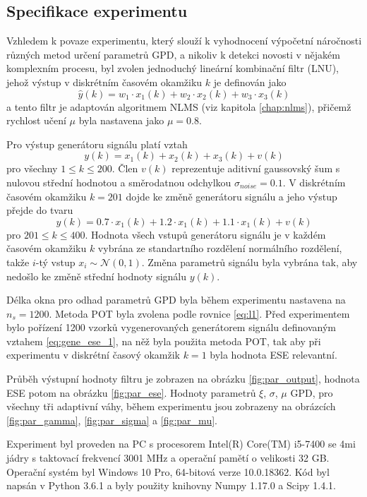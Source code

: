 \subsection{Specifikace experimentu}
Vzhledem k povaze experimentu, který slouží k vyhodnocení výpočetní náročnosti různých metod určení parametrů GPD, a nikoliv k detekci novosti v nějakém komplexním procesu, byl zvolen jednoduchý lineární kombinační filtr (LNU), jehož výstup v diskrétním časovém okamžiku $k$ je definován jako
\begin{equation}\label{eq:gene_ese_1}
\hat{y}(k)=w_1\cdot x_1(k)+w_2\cdot x_2(k)+w_3\cdot x_3(k)
\end{equation}
a tento filtr je adaptován algoritmem NLMS (viz kapitola \ref{chap:nlms}), přičemž rychlost učení $\mu$ byla nastavena jako $\mu=0.8$.
\par 
Pro výstup generátoru signálu platí vztah
\begin{equation}
y(k)=x_1(k)+x_2(k)+x_3(k)+v(k)
\end{equation}
pro všechny $1 \leq k \leq 200$. Člen $v(k)$ reprezentuje aditivní gaussovský šum s nulovou střední hodnotou a směrodatnou odchylkou $\sigma_{noise}=0.1$. V diskrétním časovém okamžiku $k=201$ dojde ke změně generátoru signálu a jeho výstup přejde do tvaru
\begin{equation}
y(k)=0.7\cdot x_1(k)+1.2\cdot x_1(k)+1.1 \cdot x_1(k) + v(k)
\end{equation}
pro $201 \leq k \leq 400$. Hodnota všech vstupů generátoru signálu je v každém časovém okamžiku $k$ vybrána ze standartního rozdělení normálního rozdělení, takže $i$-tý vstup $x_i\sim \mathcal{N}(0,1)$. Změna parametrů signálu byla vybrána tak, aby nedošlo ke změně střední hodnoty signálu $y(k)$.
\par
Délka okna pro odhad parametrů GPD byla během experimentu nastavena na $n_s=1200$. Metoda POT byla zvolena podle rovnice \ref{eq:l1}. Před experimentem bylo pořízení 1200 vzorků vygenerovaných generátorem signálu definovaným vztahem \ref{eq:gene_ese_1}, na něž byla použita metoda POT, tak aby při experimentu v diskrétní časový okamžik $k=1$ byla hodnota ESE relevantní.
\par
Průběh výstupní hodnoty filtru je zobrazen na obrázku \ref{fig:par_output}, hodnota ESE potom na obrázku \ref{fig:par_ese}. Hodnoty parametrů $\xi$, $\sigma$, $\mu$ GPD, pro všechny tři adaptivní váhy, během experimentu jsou zobrazeny na obrázcích \ref{fig:par_gamma}, \ref{fig:par_sigma} a \ref{fig:par_mu}.
\par
Experiment byl proveden na PC s procesorem Intel(R) Core(TM) i5-7400 se 4mi jádry s taktovací frekvencí 3001 MHz a operační pamětí o velikosti 32 GB. Operační systém byl Windows 10 Pro, 64-bitová verze 10.0.18362. Kód byl napsán v Python 3.6.1 a byly použity knihovny Numpy 1.17.0 a Scipy 1.4.1.


